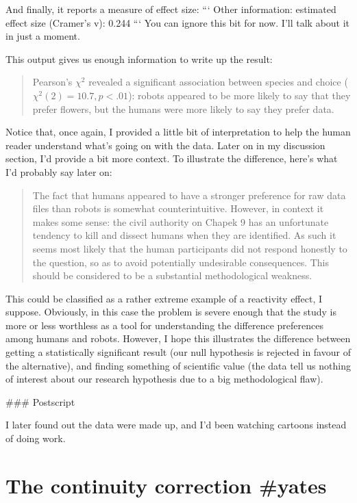 And finally, it reports a measure of effect size:
```
Other information: 
   estimated effect size (Cramer's v):  0.244 
```
You can ignore this bit for now. I'll talk about it in just a moment.

This output gives us enough information to write up the result:
\begin{quote}
Pearson's $\chi^2$ revealed a significant association between species and choice ($\chi^2(2) = 10.7, p < .01$): robots appeared to be more likely to say that they prefer flowers, but the humans were more likely to say they prefer data.
\end{quote}
Notice that, once again, I provided a little bit of interpretation to help the human reader understand what's going on with the data. Later on in my discussion section, I'd provide a bit more context. To illustrate the difference, here's what I'd probably say later on:
\begin{quote}
The fact that humans appeared to have a stronger preference for raw data files than robots is somewhat counterintuitive. However, in context it makes some sense: the civil authority on Chapek 9 has an unfortunate tendency to kill and dissect humans when they are identified. As such it seems most likely that the human participants did not respond honestly to the question, so as to avoid potentially undesirable consequences. This should be considered to be a substantial methodological weakness.
\end{quote}
This could be classified as a rather extreme example of a reactivity effect, I suppose. Obviously, in this case the problem is severe enough that the study is more or less worthless as a tool for understanding the difference preferences among humans and robots. However, I hope this illustrates the difference between getting a statistically significant result (our null hypothesis is rejected in favour of the alternative), and finding something of scientific value (the data tell us nothing of interest about our research hypothesis due to a big methodological flaw).





### Postscript

I later found out the data were made up, and I'd been watching cartoons instead of doing work.
\vspace*{12pt}




\section{The continuity correction {#yates}}

